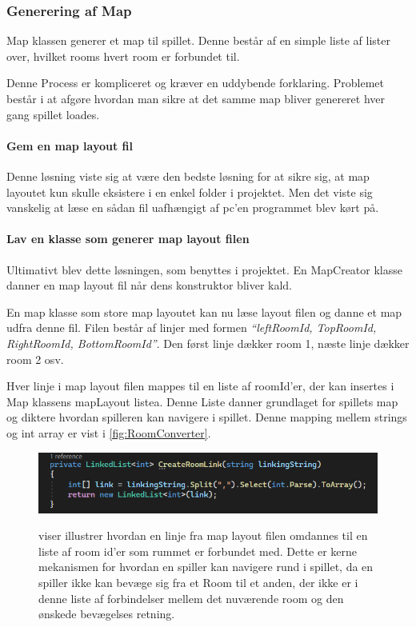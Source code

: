\subsubsection{Generering af Map}
\noindent Map klassen generer et map til spillet. Denne består af en
simple liste af lister over, hvilket rooms hvert room er 
forbundet til.

Denne Process er kompliceret og kræver en uddybende forklaring. Problemet 
består i at afgøre hvordan man sikre at det samme map bliver genereret
hver gang spillet loades. 

\paragraph{Gem en map layout fil \\}
Denne løsning viste sig at være den bedste løsning for at sikre sig, at 
map layoutet kun skulle eksistere i en enkel folder i projektet.
Men det viste sig vanskelig at læse en sådan fil uafhængigt af pc'en 
programmet blev kørt på.

\paragraph{Lav en klasse som generer map layout filen \\}
Ultimativt blev dette løsningen, som benyttes i projektet. En MapCreator
klasse danner en map layout fil når dens konstruktor bliver kald.

En map klasse som store map layoutet kan nu læse layout filen og 
danne et map udfra denne fil.
Filen består af linjer med formen \textit{``leftRoomId, TopRoomId, RightRoomId, BottomRoomId''}. Den først linje dækker room 1, næste linje dækker room 2 osv.

Hver linje i map layout filen mappes til en liste af roomId'er,  der kan insertes i Map
klassens mapLayout listea. Denne Liste danner grundlaget for spillets map og 
diktere hvordan spilleren kan navigere i spillet. Denne mapping mellem strings og int array
er vist i \autoref{fig:RoomConverter}.

\begin{figure}[h]
  \centering
  \caption{viser illustrer hvordan en linje fra map layout filen omdannes til en liste af room id'er 
           som rummet er forbundet med. Dette er kerne mekanismen for hvordan en spiller kan navigere
           rund i spillet, da en spiller ikke kan bevæge sig fra et Room til et anden, der ikke er 
           i denne liste af forbindelser mellem det nuværende room og den ønskede bevægelses retning.}
  \includegraphics[scale=0.8]{02-Body/Implementering/GameEngineImplementering/Images/MappingRoomString.png}
  \label{fig:RoomConverter}
\end{figure}

